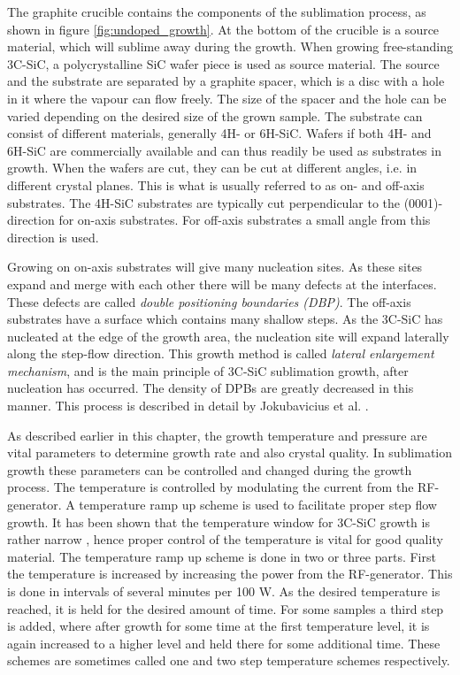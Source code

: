 The graphite crucible contains the components of the sublimation process, as shown in figure \ref{fig:undoped_growth}. At the bottom of the crucible is a source material, which will sublime away during the growth. When growing free-standing 3C-SiC, a polycrystalline SiC wafer piece is used as source material. The source and the substrate are separated by a graphite spacer, which is a disc with a hole in it where the vapour can flow freely. The size of the spacer and the hole can be varied depending on the desired size of the grown sample. The substrate can consist of different materials, generally 4H- or 6H-SiC. Wafers if both 4H- and 6H-SiC are commercially available and can thus readily be used as substrates in growth. When the wafers are cut, they can be cut at different angles, i.e. in different crystal planes. This is what is usually referred to as on- and off-axis substrates. The 4H-SiC substrates are typically cut perpendicular to the (0001)-direction for on-axis substrates. For off-axis substrates a small angle from this direction is used. 

Growing on on-axis substrates will give many nucleation sites. As these sites expand and merge with each other there will be many defects at the interfaces. These defects are called \emph{double positioning boundaries (DBP)}. The off-axis substrates have a surface which contains many shallow steps. As the 3C-SiC has nucleated at the edge of the growth area, the nucleation site will expand laterally along the step-flow direction. This growth method is called \emph{lateral enlargement mechanism}, and is the main principle of 3C-SiC sublimation growth, after nucleation has occurred. The density of DPBs are greatly decreased in this manner. This process is described in detail by Jokubavicius et al. \cite{Jokubavicius2014}.

As described earlier in this chapter, the growth temperature and pressure are vital parameters to determine growth rate and also crystal quality. In sublimation growth these parameters can be controlled and changed during the growth process. The temperature is controlled by modulating the current from the RF-generator. A temperature ramp up scheme is used to facilitate proper step flow growth. It has been shown that the temperature window for 3C-SiC growth is rather narrow \cite{Vasiliauskas2012}, hence proper control of the temperature is vital for good quality material. The temperature ramp up scheme is done in two or three parts. First the temperature is increased by increasing the power from the RF-generator. This is done in intervals of several minutes per 100 W. As the desired temperature is reached, it is held for the desired amount of time. For some samples a third step is added, where after growth for some time at the first temperature level, it is again increased to a higher level and held there for some additional time. These schemes are sometimes called one and two step temperature schemes respectively. 

